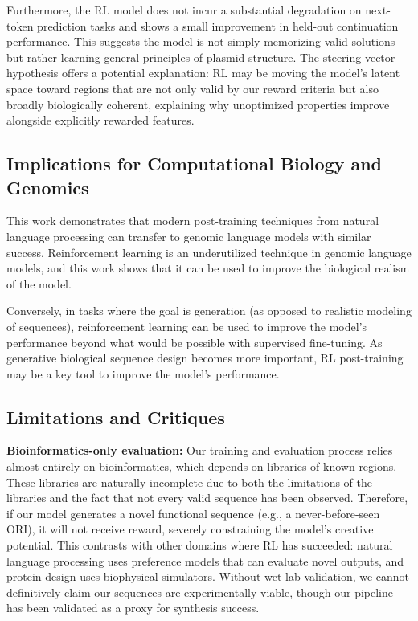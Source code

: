 \documentclass{article}
\theoremstyle{plain}
\theoremstyle{definition}
\theoremstyle{remark}
\begin{document}
Furthermore, the RL model does not incur a substantial degradation on
next-token prediction tasks and shows a small improvement in held-out
continuation performance. This suggests the model is not simply memorizing valid
solutions but rather learning general principles of plasmid structure.
The steering vector hypothesis offers a potential explanation: RL may be
moving the model's latent space toward regions that are not only valid by
our reward criteria but also broadly biologically coherent, explaining why
unoptimized properties improve alongside explicitly rewarded features.

\subsection{Implications for Computational Biology and Genomics}

This work demonstrates that modern post-training techniques from natural
language processing can transfer to genomic language models with similar
success. Reinforcement learning is an underutilized technique in genomic language models,
and this work shows that it can be used to improve the biological realism of the model.

Conversely, in tasks where the goal is generation (as opposed to realistic modeling of 
sequences), reinforcement learning can be used to improve the model's performance beyond
what would be possible with supervised fine-tuning. As generative biological sequence design becomes more important,
RL post-training may be a key tool to improve the model's performance.



\subsection{Limitations and Critiques}

\textbf{Bioinformatics-only evaluation:} Our training and evaluation
process relies almost entirely on bioinformatics, which depends on
libraries of known regions. These libraries are naturally incomplete due to both the limitations of the libraries and the fact that not every valid sequence has been observed.
Therefore, if our model generates a novel functional sequence (e.g., a
never-before-seen ORI), it will not receive reward, severely constraining
the model's creative potential. This contrasts with other domains where RL has
succeeded: natural language processing uses preference models that can
evaluate novel outputs, and protein design uses biophysical simulators.
Without wet-lab validation, we cannot definitively claim our sequences are
experimentally viable, though our pipeline has been validated as a proxy
for synthesis success.
\end{document}
